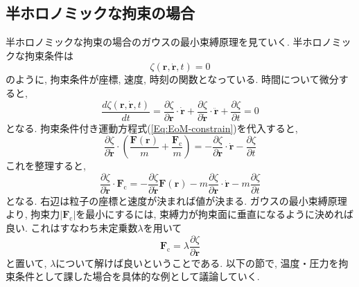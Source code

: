\subsection{半ホロノミックな拘束の場合}
半ホロノミックな拘束の場合のガウスの最小束縛原理を見ていく.
半ホロノミックな拘束条件は
\begin{equation}
    \zeta(\bm{r}, \dot{\bm{r}}, t) = 0
\end{equation}
のように, 拘束条件が座標, 速度, 時刻の関数となっている.
時間について微分すると,
\begin{equation}
    \frac{d \zeta(\bm{r}, \dot{\bm{r}}, t)}{dt}
    =
    \frac{\partial \zeta}{\partial \bm{r}}
    \cdot \dot{\bm{r}}
    +
    \frac{\partial \zeta}{\partial \dot{\bm{r}}}
    \cdot \ddot{\bm{r}}
    +
    \frac{\partial \zeta}{\partial t}
    =0
\end{equation}
となる.
拘束条件付き運動方程式(\ref{Eq:EoM-constrain})を代入すると,
\begin{equation}
    \frac{\partial \zeta}{\partial \dot{\bm{r}}}
    \cdot
    \left(
        \frac{\bm{F}(\bm{r})}{m}
        +
        \frac{\bm{F}_{\mathrm{c}}}{m}
    \right)
    =
    -
    \frac{\partial \zeta}{\partial \bm{r}}
    \cdot
    \dot{\bm{r}}
    -
    \frac{\partial \zeta}{\partial t}
\end{equation}
これを整理すると,
\begin{equation}
    \frac{\partial \zeta}{\partial \dot{\bm{r}}}
    \cdot
    \bm{F}_{\mathrm{c}}
    =
    -
    \frac{\partial \zeta}{\partial \dot{\bm{r}}}
    \bm{F}(\bm{r})
    - m
    \frac{\partial \zeta}{\partial \bm{r}}
    \cdot
    \dot{\bm{r}}
    - m
    \frac{\partial \zeta}{\partial t}
\end{equation}
となる. 右辺は粒子の座標と速度が決まれば値が決まる.
ガウスの最小束縛原理より, 拘束力$|\bm{F}_{\mathrm{c}}|$を最小にするには, 束縛力が拘束面に垂直になるように決めれば良い. これはすなわち未定乗数$\lambda$を用いて
\begin{equation}
    \bm{F}_{\mathrm{c}}
    =
    \lambda
    \frac{\partial \zeta}{\partial \bm{r}}
\end{equation}
と置いて, $\lambda$について解けば良いということである.
以下の節で, 温度・圧力を拘束条件として課した場合を具体的な例として議論していく.





